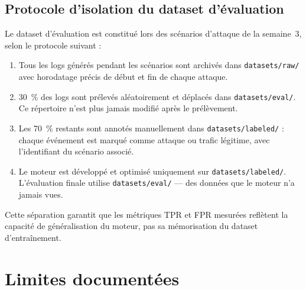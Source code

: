 \documentclass[12pt,a4paper]{article}
\begin{document}
\subsection{Protocole d'isolation du dataset d'évaluation}

Le dataset d'évaluation est constitué lors des scénarios d'attaque de la
semaine~3, selon le protocole suivant :

\begin{enumerate}
    \item Tous les logs générés pendant les scénarios sont archivés dans
    \texttt{datasets/raw/} avec horodatage précis de début et fin de chaque
    attaque.
    \item 30~\% des logs sont prélevés aléatoirement et déplacés dans
    \texttt{datasets/eval/}. Ce répertoire n'est plus jamais modifié après
    le prélèvement.
    \item Les 70~\% restants sont annotés manuellement dans
    \texttt{datasets/labeled/} : chaque événement est marqué comme attaque
    ou trafic légitime, avec l'identifiant du scénario associé.
    \item Le moteur est développé et optimisé uniquement sur
    \texttt{datasets/labeled/}. L'évaluation finale utilise
    \texttt{datasets/eval/} --- des données que le moteur n'a jamais vues.
\end{enumerate}

Cette séparation garantit que les métriques TPR et FPR mesurées reflètent
la capacité de généralisation du moteur, pas sa mémorisation du dataset
d'entraînement.

\section{Limites documentées}
\end{document}
